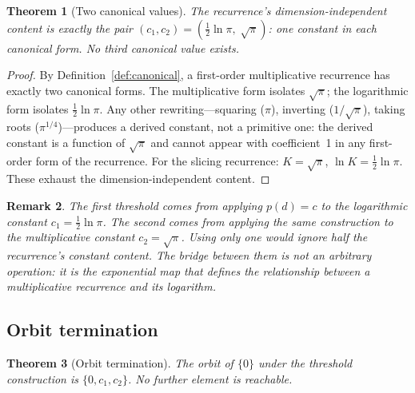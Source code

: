 \documentclass[11pt,a4paper]{article}
\newtheorem{theorem}{Theorem}[section]
\newtheorem{remark}[theorem]{Remark}
\begin{document}
\begin{theorem}[Two canonical values]\label{thm:twovalues}
The recurrence's dimension-independent content is exactly the pair
$(c_1, c_2) = (\tfrac{1}{2}\ln\pi,\;\sqrt{\pi})$: one constant in each
canonical form. No third canonical value exists.
\end{theorem}

\begin{proof}
By Definition~\ref{def:canonical}, a first-order multiplicative recurrence
has exactly two canonical forms. The multiplicative form isolates
$\sqrt{\pi}$; the logarithmic form isolates $\frac{1}{2}\ln\pi$. Any
other rewriting---squaring ($\pi$), inverting ($1/\sqrt{\pi}$), taking
roots ($\pi^{1/4}$)---produces a derived constant, not a primitive one:
the derived constant is a function of $\sqrt{\pi}$ and cannot appear with
coefficient~1 in any first-order form of the recurrence. For the slicing
recurrence: $K = \sqrt{\pi}$, $\ln K = \frac{1}{2}\ln\pi$. These exhaust
the dimension-independent content.
\end{proof}

\begin{remark}
The first threshold comes from applying $p(d) = c$ to the logarithmic
constant $c_1 = \frac{1}{2}\ln\pi$. The second comes from applying the
same construction to the multiplicative constant $c_2 = \sqrt{\pi}$.
Using only one would ignore half the recurrence's constant content. The
bridge between them is not an arbitrary operation: it is the exponential
map that defines the relationship between a multiplicative recurrence and
its logarithm.
\end{remark}

\subsection{Orbit termination}

\begin{theorem}[Orbit termination]\label{thm:terminate}
The orbit of $\{0\}$ under the threshold construction is
$\{0, c_1, c_2\}$. No further element is reachable.
\end{theorem}
\end{document}
